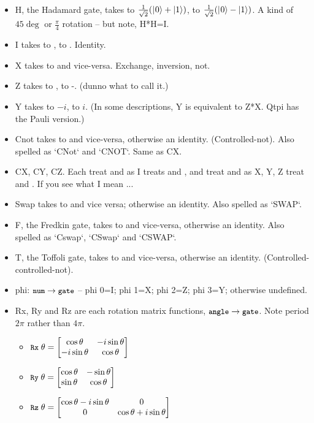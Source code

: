 \documentclass[11pt,a4paper]{book}
\newcommand{\verbtt}[1]{\texttt{\small{}#1}}
\begin{document}
\begin{itemize}
\item  H, the Hadamard gate, takes \zero{} to $\frac{1}{\sqrt{2}}(|\hspace{0.5pt}0\rangle+|1\rangle\relax)$, \one{} to $\frac{1}{\sqrt{2}}(|\hspace{0.5pt}0\rangle-|1\rangle\relax)$. A kind of $45\deg$ or $\frac{\pi}{4}$ rotation -- but note, H*H=I.
\item I takes \zero{} to \zero, \one{} to \one. Identity.
\item X  takes \zero{} to \one{} and vice-versa. Exchange, inversion, not.
\item Z  takes \zero{} to \zero, \one{} to -\one{}. (dunno what to call it.)
\item Y  takes \zero{} to $-i$\one{}, \one{} to $i$\zero{}. (In some descriptions, Y is equivalent to Z*X. Qtpi has the Pauli version.)
\item Cnot takes \onezero{} to \oneone{} and vice-versa, otherwise an identity. (Controlled-not). Also spelled as `CNot` and `CNOT`. Same as CX.
\item CX, CY, CZ. Each treat \zerozero{} and \zeroone{} as I treats \zero{} and \one, and treat \onezero{} and \oneone{} as X, Y, Z treat \zero{} and \one{}. If you see what I mean ...
\item Swap takes \zeroone{} to \onezero{} and vice versa; otherwise an identity. Also spelled as `SWAP`.
\item F, the Fredkin gate, takes \onezeroone{} to \oneonezero{} and vice-versa, otherwise an identity. Also spelled as `Cswap`, `CSwap` and `CSWAP`.
\item T, the Toffoli gate, takes \oneonezero{} to \oneoneone{} and vice-versa, otherwise an identity. (Controlled-controlled-not). \vspace{5pt}

\item phi: $\verbtt{num}->\verbtt{gate}$ -- phi 0=I; phi 1=X; phi 2=Z; phi 3=Y; otherwise undefined. \vspace{5pt}

\item Rx, Ry and Rz are each rotation matrix functions, $\verbtt{angle}->\verbtt{gate}$. Note period $2\pi$ rather than $4\pi$.
  \begin{itemize}
  \item $\verbtt{Rx}\;\theta = \qgate{\cos\theta}{-i\sin\theta}{-i\sin\theta}{\cos\theta}$
  \item $\verbtt{Ry}\;\theta = \qgate{\cos\theta}{-\sin\theta}{\sin\theta}{\cos\theta}$
  \item $\verbtt{Rz}\;\theta = \qgate{\cos\theta-i\sin\theta}{0}{0}{\cos\theta+i\sin\theta}$
  \end{itemize}
\end{itemize}
  
\end{document}
